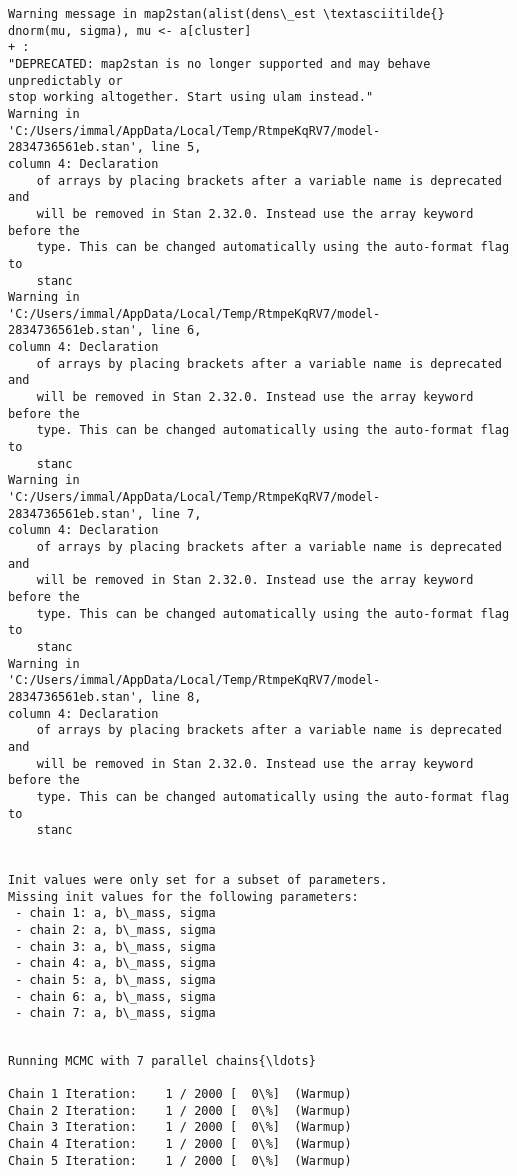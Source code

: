 \documentclass[11pt]{article}
\begin{document}
    \begin{Verbatim}[commandchars=\\\{\}]
Warning message in map2stan(alist(dens\_est \textasciitilde{} dnorm(mu, sigma), mu <- a[cluster]
+ :
"DEPRECATED: map2stan is no longer supported and may behave unpredictably or
stop working altogether. Start using ulam instead."
Warning in
'C:/Users/immal/AppData/Local/Temp/RtmpeKqRV7/model-2834736561eb.stan', line 5,
column 4: Declaration
    of arrays by placing brackets after a variable name is deprecated and
    will be removed in Stan 2.32.0. Instead use the array keyword before the
    type. This can be changed automatically using the auto-format flag to
    stanc
Warning in
'C:/Users/immal/AppData/Local/Temp/RtmpeKqRV7/model-2834736561eb.stan', line 6,
column 4: Declaration
    of arrays by placing brackets after a variable name is deprecated and
    will be removed in Stan 2.32.0. Instead use the array keyword before the
    type. This can be changed automatically using the auto-format flag to
    stanc
Warning in
'C:/Users/immal/AppData/Local/Temp/RtmpeKqRV7/model-2834736561eb.stan', line 7,
column 4: Declaration
    of arrays by placing brackets after a variable name is deprecated and
    will be removed in Stan 2.32.0. Instead use the array keyword before the
    type. This can be changed automatically using the auto-format flag to
    stanc
Warning in
'C:/Users/immal/AppData/Local/Temp/RtmpeKqRV7/model-2834736561eb.stan', line 8,
column 4: Declaration
    of arrays by placing brackets after a variable name is deprecated and
    will be removed in Stan 2.32.0. Instead use the array keyword before the
    type. This can be changed automatically using the auto-format flag to
    stanc


Init values were only set for a subset of parameters.
Missing init values for the following parameters:
 - chain 1: a, b\_mass, sigma
 - chain 2: a, b\_mass, sigma
 - chain 3: a, b\_mass, sigma
 - chain 4: a, b\_mass, sigma
 - chain 5: a, b\_mass, sigma
 - chain 6: a, b\_mass, sigma
 - chain 7: a, b\_mass, sigma


    \end{Verbatim}

    \begin{Verbatim}[commandchars=\\\{\}]
Running MCMC with 7 parallel chains{\ldots}

Chain 1 Iteration:    1 / 2000 [  0\%]  (Warmup)
Chain 2 Iteration:    1 / 2000 [  0\%]  (Warmup)
Chain 3 Iteration:    1 / 2000 [  0\%]  (Warmup)
Chain 4 Iteration:    1 / 2000 [  0\%]  (Warmup)
Chain 5 Iteration:    1 / 2000 [  0\%]  (Warmup)
    \end{Verbatim}
\end{document}

